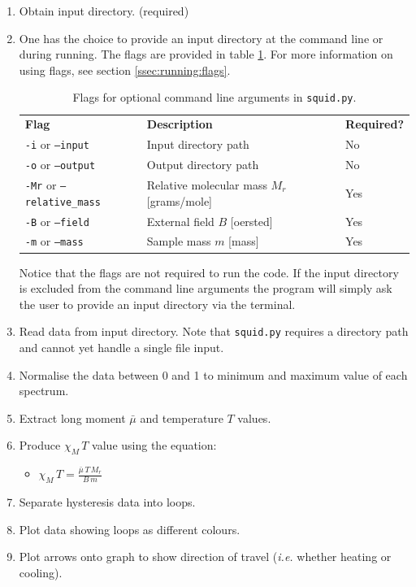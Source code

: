 \begin{enumerate}
	\item	Obtain input directory. (required)
	\item[]	%
		{One has the choice to provide an input directory at the command line or during running. The flags are provided in table \ref{tab:squid:flags}. For more information on using flags, see section \ref{ssec:running:flags}.
		
		\begin{table}[H]
			\begin{center}
				\begin{tabular}{l l l}
					\hline
					\textbf{Flag}	&	\textbf{Description}	&	\textbf{Required?}\\
					\texttt{-i} or \texttt{--input}		& Input directory path	&	No	\\
					\texttt{-o} or \texttt{--output}	& Output directory path	&	No	\\
					\texttt{-Mr} or \texttt{--relative\_mass}	& Relative molecular mass $ M_r $ [grams/mole]	&	Yes	\\
					\texttt{-B} or \texttt{--field}	& External field $ B $ [oersted]	&	Yes	\\
					\texttt{-m} or \texttt{--mass}		& Sample mass $ m $ [mass]	&	Yes	\\
					\hline
				\end{tabular}
			\end{center}
			\caption[SQUID flags.]{\label{tab:squid:flags}%
				Flags for optional command line arguments in \texttt{squid.py}.%
			}
		\end{table}
		
		Notice that the flags are not required to run the code. If the input directory is excluded from the command line arguments the program will simply ask the user to provide an input directory via the terminal.
		}
	\item	Read data from input directory. Note that \texttt{squid.py} requires a directory path and cannot yet handle a single file input.
	\item	Normalise the data between 0 and 1 to minimum and maximum value of each spectrum.
	\item	Extract long moment $ \bar{\mu} $ and temperature $ T $ values.
	\item	Produce $ \chi_M\,T $ value using the equation:
	\begin{itemize}
		\item[]	$ \chi_M\,T = \frac{\bar{\mu} \, T \, M_r}{ B \, m } $
	\end{itemize}
 	\item	Separate hysteresis data into loops.
 	\item	Plot data showing loops as different colours. 
 	\item	Plot arrows onto graph to show direction of travel (\textit{i.e.} whether heating or cooling).
\end{enumerate}

